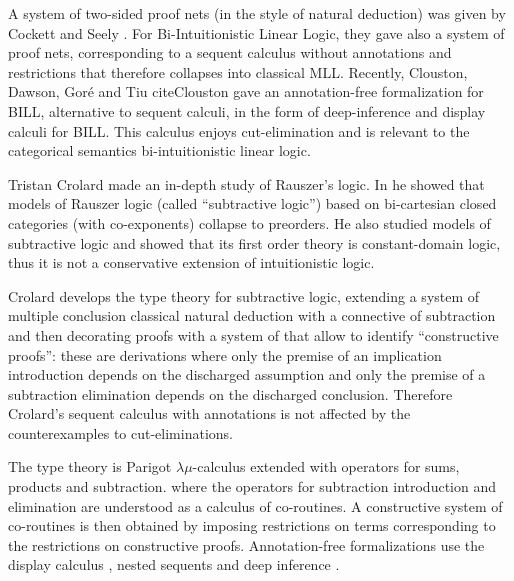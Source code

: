 {A system of two-sided proof nets (in the style of natural deduction)
was given by Cockett and Seely \cite{Cockett:1997}.  For
Bi-Intuitionistic Linear Logic, they gave also a system of proof nets,
corresponding to a sequent calculus without annotations and
restrictions that therefore collapses into classical MLL.  Recently,
Clouston, Dawson, Goré and Tiu cite{Clouston} gave an annotation-free
formalization for BILL, alternative to sequent calculi, in the form of
deep-inference and display calculi for BILL. This calculus enjoys
cut-elimination and is relevant to the categorical semantics
bi-intuitionistic linear logic.
 

Tristan Crolard \cite{Crolard:2001,Crolard:2004} made an in-depth study of Rauszer's logic. In \cite{Crolard:2001} he showed that models of Rauszer logic (called ``subtractive logic'') based on bi-cartesian closed categories (with co-exponents) collapse to preorders.
He also studied models of subtractive logic and showed that its first order theory is constant-domain logic, thus it is not 
a conservative extension of intuitionistic logic.

Crolard \cite{Crolard:2004} develops the type theory for subtractive logic, extending a system of multiple conclusion
classical natural deduction with a connective of subtraction and then decorating proofs with a system of \cite{annotations
of dependencies} that allow to identify ``constructive proofs'': these are derivations where only the premise of an implication introduction depends on the discharged assumption and only the premise of a subtraction elimination depends on the discharged conclusion. Therefore Crolard's sequent calculus with annotations is not affected by the 
counterexamples to cut-eliminations. 

The type theory is Parigot $\lambda\mu$-calculus extended with operators for sums, products and subtraction. 
where the operators for subtraction introduction and elimination are understood as a calculus of co-routines.
A constructive system of co-routines is then obtained by imposing restrictions on terms corresponding to the restrictions
 on constructive proofs.  Annotation-free formalizations use the display calculus \cite{Gore:2000}, nested sequents
\cite{GorePostnieceTiu:2008} and deep inference \cite{Postniece:2009}.

}
